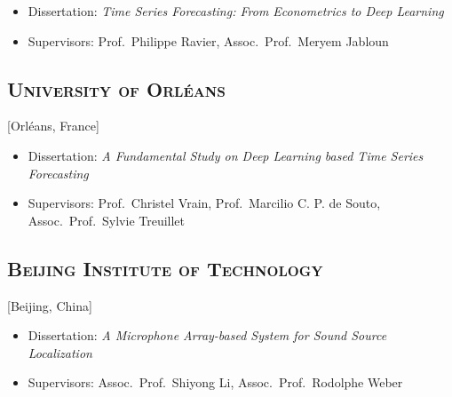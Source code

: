 \documentclass{mycv}
\begin{document}
\vspace{-0.3em}

\begin{itemize}
  \itemsep 0em
  \item Dissertation: \textit{Time Series Forecasting: From Econometrics to Deep Learning}
  \item Supervisors: Prof.~Philippe Ravier, Assoc.~Prof.~Meryem Jabloun
\end{itemize}

\vspace{-\parskip}

\subsection{\large \scshape University of Orl\'eans}[Orl\'eans, France]

\begin{positions}
\end{positions}

\vspace{-0.3em}

\begin{itemize}
  \itemsep 0em
  \item Dissertation: \textit{A Fundamental Study on Deep Learning based Time Series Forecasting}
  \item Supervisors: Prof.~Christel Vrain, Prof.~Marcilio C. P. de Souto, Assoc.~Prof.~Sylvie Treuillet
\end{itemize}

\vspace{-\parskip}

\subsection{\large \scshape Beijing Institute of Technology}[Beijing, China]

\begin{positions}
\end{positions}

\vspace{-0.3em}

\begin{itemize}
  \itemsep 0em
  \item Dissertation: \textit{A Microphone Array-based System for Sound Source Localization}
  \item Supervisors: Assoc.~Prof.~Shiyong Li, Assoc.~Prof.~Rodolphe Weber
\end{itemize}
\end{document}
